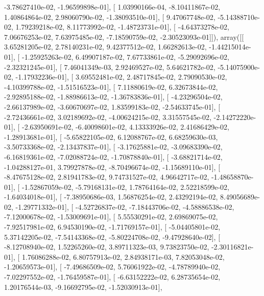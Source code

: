 \documentclass{article}
\begin{document}
         -3.78627410e-02,  -1.96599898e-01],
       [  1.03990166e-04,  -8.10411867e-02,   1.40864864e-02,
          2.98060790e-02,  -1.38093510e-01],
       [  9.47067748e-02,  -5.14388710e-02,   1.79239218e-02,
          8.11773992e-02,  -1.48723731e-01],
       [ -4.64373278e-02,   7.06676253e-02,   7.63975485e-02,
         -7.18590759e-02,  -2.30523093e-01]]), array([[  3.65281205e-02,   2.78140231e-02,   9.42377512e-02,
          1.66282613e-02,  -1.44215014e-01],
       [ -1.25925263e-02,   6.49907187e-02,   7.67733861e-02,
         -5.29092696e-02,  -2.32321245e-01],
       [  7.46041349e-03,   2.92469527e-02,   5.64621782e-02,
         -5.14075900e-02,  -1.17932236e-01],
       [  3.69552481e-02,   2.48717845e-02,   2.79090530e-02,
         -4.10399788e-02,  -1.51516523e-01],
       [  7.11880619e-02,   6.32673844e-02,  -2.92895188e-02,
         -1.88986613e-02,  -1.36783836e-01],
       [ -4.23296504e-02,  -2.66137989e-02,  -3.60670697e-02,
          1.83599183e-02,  -2.54633745e-01],
       [ -2.72436661e-02,   3.02189692e-02,  -4.00624215e-02,
          3.31557545e-02,  -2.14272220e-01],
       [ -2.63950691e-02,  -6.40098601e-02,   4.13333926e-02,
          2.41686429e-02,  -1.28913681e-01],
       [ -5.65822105e-02,   6.12088767e-02,   6.68259630e-03,
         -3.50733368e-02,  -2.13437837e-01],
       [ -3.17625881e-02,  -3.09683390e-02,  -6.16819361e-02,
         -7.02088724e-02,  -1.70878840e-01],
       [ -3.68821714e-02,  -1.04288127e-01,   3.79927878e-02,
         -8.70496674e-02,  -1.15689110e-01],
       [ -8.47675128e-02,   2.81941783e-02,   9.74731527e-02,
          4.96642717e-02,  -1.48658870e-01],
       [ -1.52867059e-02,  -5.79168131e-02,   1.78764164e-02,
          2.52218599e-02,  -1.64034018e-01],
       [ -7.38950686e-03,   1.56876254e-02,   2.43292194e-02,
          8.49056689e-02,  -1.29771332e-01],
       [ -4.52726837e-02,  -7.18443706e-02,  -4.58886538e-02,
         -7.12000678e-02,  -1.53009691e-01],
       [  5.55530291e-02,   2.69869075e-02,  -7.92517981e-02,
          6.94530190e-02,  -1.71769157e-01],
       [ -5.04405801e-02,   5.37142205e-02,  -7.54143368e-02,
         -5.80224708e-02,  -9.47928640e-02],
       [ -8.12708940e-02,   1.52265260e-02,   3.89711323e-03,
          9.73823750e-02,  -2.30116821e-01],
       [  1.76086288e-02,   6.80757913e-02,   2.84938171e-03,
          7.82053048e-02,  -1.20659573e-01],
       [ -7.49686509e-02,   5.76061922e-02,  -4.78789940e-02,
         -7.02297552e-02,  -1.76459587e-01],
       [ -6.63152222e-02,   6.28735654e-02,   1.20176544e-03,
         -9.16692795e-02,  -1.52030913e-01],
\end{document}
